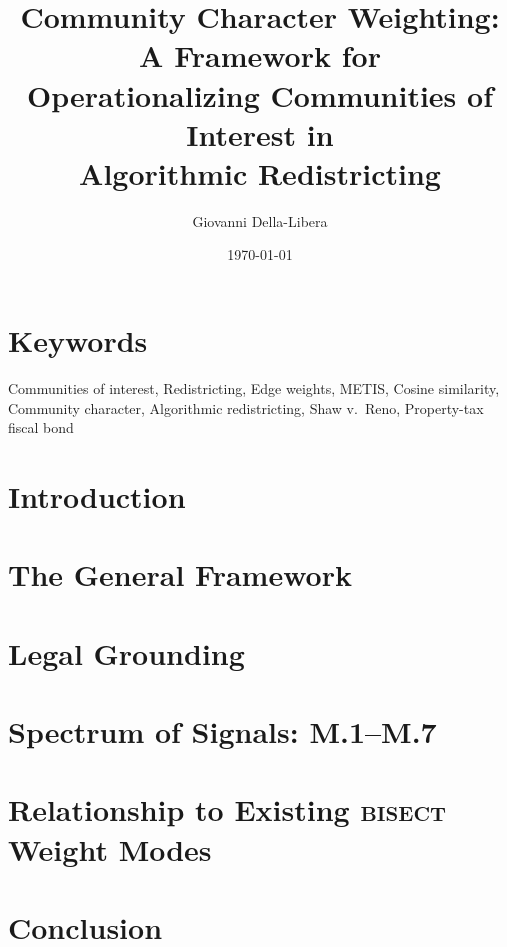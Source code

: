 \documentclass[12pt]{article}
\title{\textbf{Community Character Weighting: A Framework for\\
Operationalizing Communities of Interest in\\
Algorithmic Redistricting}}
\author{Giovanni Della-Libera}
\date{\today}
\begin{document}
\maketitle

\begin{abstract}

\end{abstract}

\section*{Keywords}
Communities of interest, Redistricting, Edge weights, METIS, Cosine similarity,
Community character, Algorithmic redistricting, Shaw v.\ Reno, Property-tax fiscal bond

\section{Introduction}


\section{The General Framework}


\section{Legal Grounding}


\section{Spectrum of Signals: M.1--M.7}


\section{Relationship to Existing \textsc{bisect} Weight Modes}


\section{Conclusion}




\end{document}
